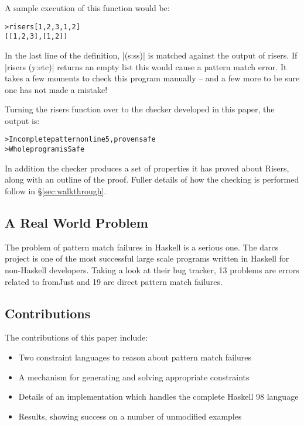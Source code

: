 \documentclass[preprint]{sigplanconf}
\newcommand{\C}[1]{\textsf{#1}}
\newenvironment{code}{\begin{alltt}\small}{\end{alltt}}
\begin{document}
A sample execution of this function would be:

\begin{code}
> risers [1,2,3,1,2]
[[1,2,3],[1,2]]
\end{code}

In the last line of the definition, |(s:ss)| is matched against the output of \C{risers}. If |risers (y:etc)| returns an empty list this would cause a pattern match error. It takes a few moments to check this program manually -- and a few more to be sure one has not made a mistake!

Turning the \C{risers} function over to the checker developed in this paper, the output is:

\begin{code}
> Incomplete pattern on line 5, proven safe
> Whole program is Safe
\end{code}

In addition the checker produces a set of properties it has proved about Risers, along with an outline of the proof. Fuller details of how the checking is performed follow in \S\ref{sec:walkthrough}.

\subsection{A Real World Problem}

The problem of pattern match failures in Haskell is a serious one. The darcs \citep{darcs} project is one of the most successful large scale programs written in Haskell for non-Haskell developers. Taking a look at their bug tracker, 13 problems are errors related to fromJust and 19 are direct pattern match failures.

\subsection{Contributions}

The contributions of this paper include:

\begin{itemize}
\item Two constraint languages to reason about pattern match failures
\item A mechanism for generating and solving appropriate constraints
\item Details of an implementation which handles the complete Haskell 98 language
\item Results, showing success on a number of unmodified examples
\end{itemize}
\end{document}
